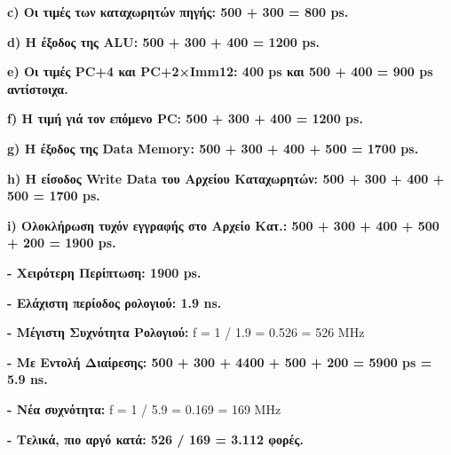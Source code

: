\documentclass{article}
\begin{document}
\vspace{0.1cm}
\textbf{\textlatin{c}) Οι τιμές των καταχωρητών πηγής: \textlatin{500 + 300 = 800 ps.}}

\vspace{0.1cm}
\textbf{\textlatin{d}) Η έξοδος της \textlatin{ALU}: \textlatin{500 + 300 + 400 = 1200 ps.}}

\vspace{0.1cm}
\textbf{\textlatin{e}) Οι τιμές \textlatin{PC+4} και \textlatin{PC+2×Imm12}: \textlatin{400 ps} και \textlatin{500 + 400 = 900 ps} αντίστοιχα.}

\vspace{0.1cm}
\textbf{\textlatin{f}) Η τιμή γιά τον επόμενο \textlatin{PC}: \textlatin{500 + 300 + 400 = 1200 ps.}}

\vspace{0.1cm}
\textbf{\textlatin{g}) Η έξοδος της \textlatin{Data Memory}: \textlatin{500 + 300 + 400 + 500 = 1700 ps.}}

\vspace{0.1cm}
\textbf{\textlatin{h}) Η είσοδος \textlatin{Write Data} του Αρχείου Καταχωρητών: \textlatin{500 + 300 + 400 + 500 = 1700 ps.}}

\vspace{0.1cm}
\textbf{\textlatin{i}) Ολοκλήρωση τυχόν εγγραφής στο Αρχείο Κατ.: \textlatin{500 + 300 + 400 + 500 + 200 = 1900 ps.}}

\vspace{0.75cm}
\textbf{- Χειρότερη Περίπτωση: \textlatin{1900 ps.}}

\vspace{0.1cm}
\textbf{- Ελάχιστη περίοδος ρολογιού: \textlatin{1.9 ns.}}

\vspace{0.1cm}
\textbf{- Μέγιστη Συχνότητα Ρολογιού: } \textlatin{f = 1 / 1.9 = 0.526 = 526 MHz}

\vspace{0.1cm}
\textbf{- Με Εντολή Διαίρεσης: \textlatin{500 + 300 + 4400 + 500 + 200 = 5900 ps = 5.9 ns.}}

\vspace{0.1cm}
\textbf{- Νέα συχνότητα: } \textlatin{f = 1 / 5.9 = 0.169 = 169 MHz}

\vspace{0.1cm}
\textbf{- Τελικά, πιο αργό κατά: 526 / 169 = 3.112 φορές.}

\vspace{10.1cm}
\hline

\end{document}
